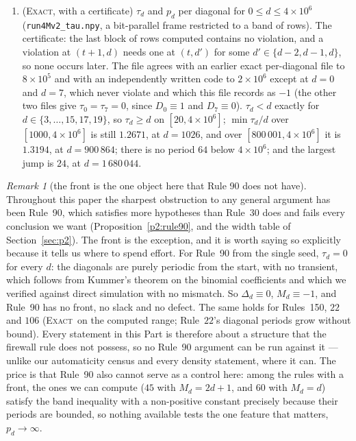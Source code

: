 \documentclass[11pt]{article}
\theoremstyle{definition}
\theoremstyle{remark}
\newtheorem{remark}[theorem]{Remark}
\newcommand{\EXACT}{\textsc{Exact}}
\begin{document}
\begin{enumerate}
\item[\textbf{E10}] (\EXACT, with a certificate) $\tau_d$ and $p_d$ per diagonal for $0\le d\le4\times10^{6}$ (\texttt{run4Mv2\_tau.npy}, a bit-parallel frame restricted to a band of rows). The certificate: the last block of rows computed contains no violation, and a violation at $(t+1,d)$ needs one at $(t,d')$ for some $d'\in\{d-2,d-1,d\}$, so none occurs later. The file agrees with an earlier exact per-diagonal file to $8\times10^{5}$ and with an independently written code to $2\times10^{6}$ except at $d=0$ and $d=7$, which never violate and which this file records as $-1$ (the other two files give $\tau_0=\tau_7=0$, since $D_0\equiv1$ and $D_7\equiv0$). $\tau_d<d$ exactly for $d\in\{3,\dots,15,17,19\}$, so $\tau_d\ge d$ on $[20,4\times10^{6}]$; $\min\tau_d/d$ over $[1000,4\times10^{6}]$ is still $1.2671$, at $d=1026$, and over $[800\,001,4\times10^{6}]$ it is $1.3194$, at $d=900\,864$; there is no period $64$ below $4\times10^{6}$; and the largest jump is $24$, at $d=1\,680\,044$.
\end{enumerate}


\begin{remark}[the front is the one object here that Rule 90 does not have]\label{fr:nofront}
Throughout this paper the sharpest obstruction to any general argument has been Rule~90, which
satisfies more hypotheses than Rule~30 does and fails every conclusion we want
(Proposition~\ref{p2:rule90}, and the width table of Section~\ref{sec:p2}). The front is the exception,
and it is worth saying so explicitly because it tells us where to spend effort. For Rule~90 from the
single seed, $\tau_d=0$ for every $d$: the diagonals are purely periodic from the start, with no
transient, which follows from Kummer's theorem on the binomial coefficients and which we verified
against direct simulation with no mismatch. So $\Delta_d\equiv0$, $M_d\equiv-1$, and Rule~90 has no
front, no slack and no defect. The same holds for Rules~150, $22$ and $106$ (\EXACT\ on the computed range; Rule~$22$'s diagonal periods grow without bound). Every statement in this
Part is therefore about a structure that the firewall rule does not possess, so no Rule~90 argument can
be run against it --- unlike our automaticity census and every density statement, where it can. The
price is that Rule~90 also cannot serve as a control here: among the rules with a front, the ones we can
compute ($45$ with $M_d=2d+1$, and $60$ with $M_d=d$) satisfy the band inequality with a non-positive
constant precisely because their periods are bounded, so nothing available tests the one feature that
matters, $p_d\to\infty$.
\end{remark}
\end{document}
